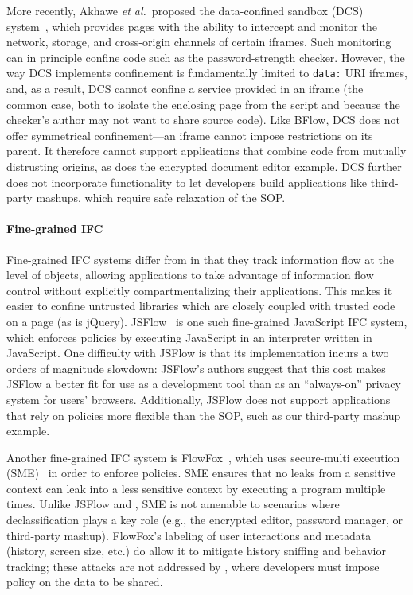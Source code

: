More recently, Akhawe \emph{et al.}~proposed the data-confined
sandbox (DCS) system~\cite{Akhawe2013}, which provides pages with the
ability to intercept and monitor the network, storage, and cross-origin
channels of certain iframes.
%
Such monitoring can in principle confine code such as the
password-strength checker.
%
However, the way DCS implements confinement is fundamentally limited to \verb|data:|
URI iframes, and, as a result, DCS cannot confine a service provided
in an iframe (the common case, both to isolate the enclosing page from
the script and because the checker's author may not want to share
source code\cite{postman}).
%
Like BFlow, DCS does not offer symmetrical confinement---an iframe
cannot impose restrictions on its parent. It therefore cannot support
applications that combine code from mutually distrusting origins, as
does the encrypted document editor example.
%
DCS further does not incorporate functionality to let developers build
applications like third-party mashups, which require safe relaxation of the
SOP\@.

\paragraph{Fine-grained IFC}
Fine-grained IFC systems differ from \sys{} in that they track
information flow at the level of objects, allowing applications
to take advantage of information flow control without explicitly
compartmentalizing their applications. This makes it easier to
confine untrusted libraries which are closely coupled with trusted
code on a page (as is jQuery).
JSFlow~\cite{JSFlow} is one such fine-grained JavaScript IFC system, which
enforces policies by executing JavaScript in an interpreter written in
JavaScript.
%
One difficulty with JSFlow is that
its implementation incurs a two orders of magnitude slowdown:
JSFlow's authors suggest that this cost makes JSFlow a better fit for use as a development tool than
as an ``always-on'' privacy system for users' browsers.
%
Additionally, JSFlow does not support applications that rely on policies
more flexible than the SOP, such as our third-party mashup example.

Another fine-grained IFC system is FlowFox~\cite{DeGroef:2012},
which uses secure-multi execution
(SME)~\cite{Devriese:2010} in order to enforce policies. SME ensures that no leaks
from a sensitive context can leak into a less sensitive context by
executing a program multiple times.
%
Unlike JSFlow and \sys{}, SME is not amenable to
scenarios where declassification plays a key role (e.g., the encrypted
editor, password manager, or third-party mashup).
%
FlowFox's labeling of user interactions and metadata (history, screen
size, etc.) do allow it to mitigate history sniffing and behavior
tracking;
these attacks are not addressed by \sys{}, where developers must
impose policy on the data to be shared.

